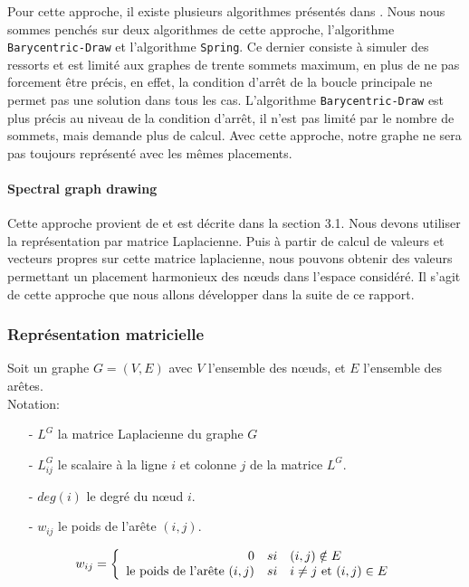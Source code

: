 \documentclass[a4paper, 11pt]{article}
\begin{document}
Pour cette approche, il existe plusieurs algorithmes présentés dans \cite{forced_theorie}. Nous nous sommes penchés sur deux algorithmes de cette approche, l'algorithme \texttt{Barycentric-Draw} et l'algorithme \texttt{Spring}. Ce dernier consiste à simuler des ressorts et est limité aux graphes de trente sommets maximum, en plus de ne pas forcement être précis, en effet, la condition d'arrêt de la boucle principale ne permet pas une solution dans tous les cas.
L'algorithme \texttt{Barycentric-Draw}  est plus précis au niveau de la condition d'arrêt, il n'est pas limité par le nombre de sommets, mais demande plus de calcul.
Avec cette approche, notre graphe ne sera pas toujours représenté avec les mêmes placements.

\paragraph{Spectral graph drawing}

Cette approche provient de \cite{spectral_theorie} et est décrite dans la section 3.1.
Nous devons utiliser la représentation par matrice Laplacienne. Puis à partir de calcul de valeurs et vecteurs propres sur cette matrice laplacienne, nous pouvons obtenir des valeurs permettant un placement harmonieux des nœuds dans l'espace considéré. Il s'agit de cette approche que nous allons développer dans la suite de ce rapport.

\subsubsection{Représentation matricielle}
Soit un graphe $G=(V,E)$ avec $V$ l'ensemble des nœuds, et $E$ l'ensemble des arêtes.\\
Notation:
\begin{itemize}
\item[-] $L^G$ la matrice Laplacienne du graphe $G$
\item[-] $L^G_{ij}$ le scalaire à la ligne $i$ et colonne $j$ de la matrice $L^G$.
\item[-] $deg(i)$ le degré du nœud $i$.
\item[-] $w_{ij}$ le poids de l'arête $(i,j)$.
\end{itemize}

\begin{equation}
  w_{ij} =
  \left\{
  \begin{array}{r l l}
    0 &si& (i,j) \notin E \\
    \text{le poids de l'arête } (i,j) &si& i \neq j \text{ et } (i,j) \in E \\
  \end{array}
  \right.
\end{equation}
\end{document}
